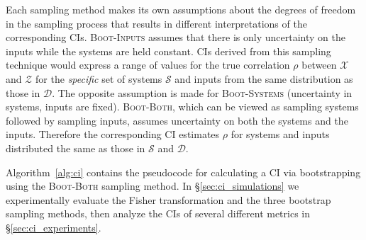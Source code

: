 Each sampling method makes its own assumptions about the degrees of freedom in the sampling process that results in different interpretations of the corresponding CIs. \textsc{Boot-Inputs} assumes that there is only uncertainty on the inputs while the systems are held constant.
CIs derived from this sampling technique would express a range of values for the true correlation $\rho$ between $\mathcal{X}$ and $\mathcal{Z}$ for the \emph{specific} set of systems $\mathcal{S}$ and inputs from the same distribution as those in $\mathcal{D}$.
The opposite assumption is made for \textsc{Boot-Systems} (uncertainty in systems, inputs are fixed).
\textsc{Boot-Both}, which can be viewed as sampling systems followed by sampling inputs, assumes uncertainty on both the systems and the inputs.
Therefore the corresponding CI estimates $\rho$ for systems and inputs distributed the same as those in $\mathcal{S}$ and $\mathcal{D}$.

Algorithm~\ref{alg:ci} contains the pseudocode for calculating a CI via bootstrapping using the \textsc{Boot-Both} sampling method.
In \S\ref{sec:ci_simulations} we experimentally evaluate the Fisher transformation and the three bootstrap sampling methods, then analyze the CIs of several different metrics in \S\ref{sec:ci_experiments}.

